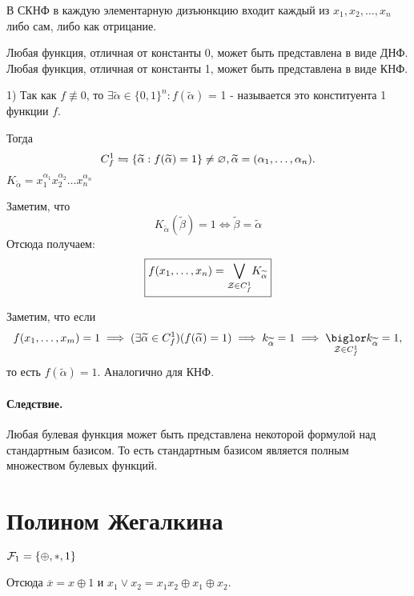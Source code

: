 \begin{definition}
В СКНФ в каждую элементарную дизъюнкцию входит каждый из $x_1,x_2,\ldots,x_{n}$ либо сам,
либо как отрицание.
\end{definition}

\begin{theorem}
Любая функция, отличная от константы 0, может быть представлена в виде ДНФ.
Любая функция, отличная от константы 1, может быть представлена в виде КНФ.
\end{theorem}
\begin{myproof}
    1) Так как $ f \not \equiv 0$, то  $\exists \widetilde{\alpha} \in \{0,1\}^{n}:
    f(\widetilde{\alpha})$ = 1 - называется это конституента 1 функции $f$.

    Тогда
    $$
    C^{1}_{f} \leftrightharpoons \{\widetilde{\alpha}:
    f(\widetilde{\alpha}) = 1\} \neq \varnothing, \widetilde{\alpha} = 
    (\alpha_1, \ldots, \alpha_n)
    .$$
    $K_{\widetilde{\alpha}} = x_1^{\alpha_1}
    x_2^{\alpha_2}\ldots x_{n}^{\alpha_n}$ 

    Заметим, что
    \[
        K_{\widetilde{\alpha}}(\widetilde{\beta}) = 1 \Longleftrightarrow \widetilde{\beta} =
        \widetilde{\alpha}
    \] 
    Отсюда получаем:
    $$
    \boxed{
    f(x_1,\ldots,x_n) = \underset{{\cal Z} \in C^{1}_f}{\bigvee}K_{\widetilde{\alpha}}
    }
    $$

    Заметим, что если
    \[
        f(x_1,\ldots,x_m) = 1 \implies (\exists \widetilde{\alpha} \in C^{1}_f)(f(\widetilde{\alpha})
        = 1) \implies k_{\widetilde{\alpha}} = 1 \implies \underset{{\cal Z} \in C^{1}_f}{\biglor}
        k_{\widetilde{\alpha}} = 1,
    \]
    то есть $f(\widetilde{\alpha}) = 1$. Аналогично для КНФ.
\end{myproof}
\paragraph*{Следствие.} Любая булевая функция может быть представлена некоторой формулой над
стандартным базисом. То есть стандартным базисом является полным множеством булевых функций.

\section{Полином Жегалкина}

${\cal F}_1 = \{\oplus, *, 1\} $ 

Отсюда $\overline{x} = x\oplus 1$ и $x_1 \lor x_2 = x_1x_2 \oplus x_1\oplus x_2$.



